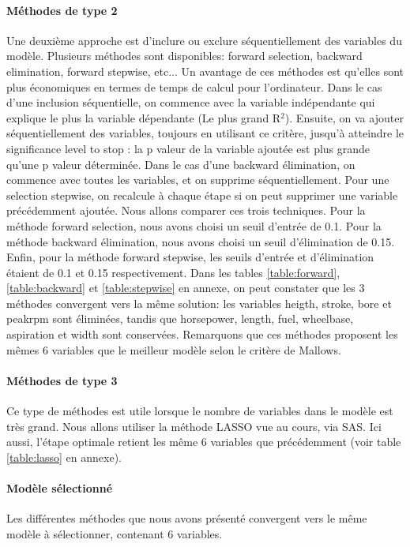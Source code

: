 \documentclass[11pt,a4paper]{article}
\begin{document}
\paragraph{Méthodes de type 2}Une deuxième approche est d'inclure ou exclure séquentiellement des variables du modèle. Plusieurs méthodes sont disponibles: forward selection, backward elimination, forward stepwise, etc... Un avantage de ces méthodes est qu'elles sont plus économiques en termes de temps de calcul pour l'ordinateur. Dans le cas d'une inclusion séquentielle, on commence avec la variable indépendante qui explique le plus la variable dépendante (Le plus grand R$^{2}$). Ensuite, on va ajouter séquentiellement des variables, toujours en utilisant ce critère, jusqu'à atteindre le significance level to stop : la p valeur de la variable ajoutée est plus grande qu'une p valeur déterminée. Dans le cas d'une backward élimination, on commence avec toutes les variables, et on supprime séquentiellement. Pour une selection stepwise, on recalcule à chaque étape si on peut supprimer une variable précédemment ajoutée. Nous allons comparer ces trois techniques. Pour la méthode forward selection, nous avons choisi un seuil d'entrée de 0.1. Pour la méthode backward élimination, nous avons choisi un seuil d'élimination de 0.15. Enfin, pour la méthode forward stepwise, les seuils d'entrée et d'élimination étaient de 0.1 et 0.15 respectivement. Dans les tables \ref{table:forward}, \ref{table:backward} et \ref{table:stepwise} en annexe, on peut constater que les 3 méthodes convergent vers la même solution: les variables heigth, stroke, bore et peakrpm sont éliminées, tandis que horsepower, length, fuel, wheelbase, aspiration et width sont conservées. Remarquons que ces méthodes proposent les mêmes 6 variables que le meilleur modèle selon le critère de Mallows.





\paragraph{Méthodes de type 3} Ce type de méthodes est utile lorsque le nombre de variables dans le modèle est très grand. Nous allons utiliser la méthode LASSO vue au cours, via SAS. Ici aussi, l'étape optimale retient les même 6 variables que précédemment (voir table \ref{table:lasso} en annexe).



\paragraph{Modèle sélectionné} Les différentes méthodes que nous avons présenté convergent vers le même modèle à sélectionner, contenant 6 variables.
\end{document}
